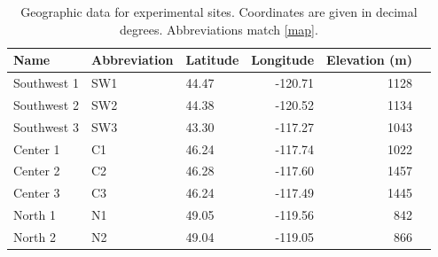 \documentclass{article}
\newcommand{\beginsupplement}{%
        \setcounter{table}{0}
        \renewcommand{\thetable}{S\arabic{table}}%
        \setcounter{figure}{0}
        \renewcommand{\thefigure}{S\arabic{figure}}%
     }
\begin{document}
{{{{{\beginsupplement

    
\clearpage

    \setcounter{page}{1}
    

\begin{table}[p]
\centering
\captionsetup{singlelinecheck = false, justification=justified}
\caption[Geographic data for experimental sites]{Geographic data for experimental sites. Coordinates are given in decimal degrees. Abbreviations match \autoref{map}.}
\begin{tabular}{lllrrr}
\toprule
Name        & Abbreviation & Latitude & Longitude & Elevation (m) \\
\midrule
Southwest 1 & SW1         & 44.47   & -120.71  & 1128          \\ %
Southwest 2 & SW2         & 44.38   & -120.52  & 1134          \\ %
Southwest 3 & SW3         & 43.30   & -117.27  & 1043          \\ %
Center 1    & C1          & 46.24   & -117.74  & 1022          \\ %
Center 2    & C2          & 46.28   & -117.60  & 1457          \\ %
Center 3    & C3          & 46.24   & -117.49  & 1445          \\ %
North 1     & N1          & 49.05    & -119.56   & 842         \\ %
North 2     & N2          & 49.04    & -119.05   & 866         \\ %
\bottomrule
\end{tabular}
\label{siteinfo}
\end{table}


\clearpage


}}}}}
\end{document}
